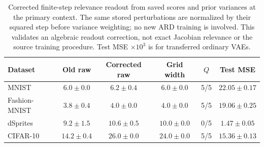 \begin{table}[H]
\caption{Corrected finite-step relevance readout from saved scores and prior variances at the primary context. The same stored perturbations are normalized by their squared step before variance weighting; no new ARD training is involved. This validates an algebraic readout correction, not exact Jacobian relevance or the source training procedure. Test MSE $\times10^3$ is for transferred ordinary VAEs.}\label{tab:ard_normalized}
\small
\setlength{\tabcolsep}{3pt}
\begin{tabular*}{\textwidth}{@{\extracolsep{\fill}}lccccc@{}}
\toprule
Dataset & Old raw & Corrected raw & Grid width & $Q$ & Test MSE \\
\midrule
MNIST & $6.0 \pm 0.0$ & $6.2 \pm 0.4$ & $6.0 \pm 0.0$ & 5/5 & $22.05 \pm 0.17$ \\
Fashion-MNIST & $3.8 \pm 0.4$ & $4.0 \pm 0.0$ & $4.0 \pm 0.0$ & 5/5 & $19.06 \pm 0.25$ \\
dSprites & $9.2 \pm 1.5$ & $10.6 \pm 0.5$ & $10.0 \pm 0.0$ & 0/5 & $1.47 \pm 0.05$ \\
CIFAR-10 & $14.2 \pm 0.4$ & $26.0 \pm 0.0$ & $24.0 \pm 0.0$ & 5/5 & $15.36 \pm 0.13$ \\
\bottomrule\end{tabular*}
\end{table}
